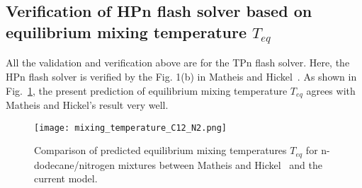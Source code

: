    \subsection{Verification of HPn flash solver based on equilibrium mixing temperature $T_{eq}$}
    All the validation and verification above are for the TPn flash solver. Here, the HPn flash solver is verified by the Fig. 1(b) in Matheis and Hickel~\cite{matheis2018multi}. As shown in Fig.~\ref{v6}, the present prediction of equilibrium mixing temperature $T_{eq}$ agrees with Matheis and Hickel's result very well.
    \begin{figure}[htb]
        \begin{center}
            \texttt{[image: mixing\_temperature\_C12\_N2.png]}
        \end{center}
        \caption{Comparison of predicted equilibrium mixing temperatures $T_{eq}$ for n-dodecane/nitrogen mixtures between Matheis and Hickel~\cite{matheis2018multi} and the current model.}
        \label{v6}
    \end{figure}

